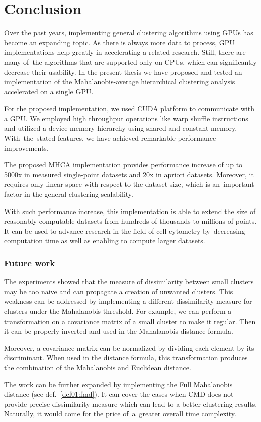 \chapter*{Conclusion}

Over the past years, implementing general clustering algorithms using GPUs has become an expanding topic. As there is always more data to process, GPU implementations help greatly in accelerating a related research.  Still, there are many of~the algorithms that are supported only on CPUs, which can significantly decrease their usability. In the present thesis we have proposed and tested an implementation of the Mahalanobis-average hierarchical clustering analysis accelerated on a single GPU. 

For the proposed implementation, we used CUDA platform to communicate with a GPU. We employed high throughput operations like warp shuffle instructions and utilized a device memory hierarchy using shared and constant memory. With~the~stated features, we have achieved remarkable performance improvements.

The proposed MHCA implementation provides performance increase of up to 5000x in measured single-point datasets and 20x in apriori datasets. Moreover, it requires only linear space with respect to the dataset size, which is an~important factor in the general clustering scalability.

With such performance increase, this implementation is able to extend the size of reasonably computable datasets from hundreds of thousands to millions of points. It can be used to advance research in the field of cell cytometry by~decreasing computation time as well as enabling to compute larger datasets.

\subsection*{Future work}

The experiments showed that the measure of dissimilarity between small clusters may be too naive and can propagate a creation of unwanted clusters. This weakness can be addressed by implementing a different dissimilarity measure for clusters under the Mahalanobis threshold. For example, we can perform a transformation on a covariance matrix of a small cluster to make it regular. Then it can be properly inverted and used in the Mahalanobis distance formula.

Moreover, a covariance matrix can be normalized by dividing each element by its discriminant. When used in the distance formula, this transformation produces the combination of the Mahalanobis and Euclidean distance.

The work can be further expanded by implementing the Full Mahalanobis distance (see def.~\ref{def01:fmd}). It can cover the cases when CMD does not provide precise dissimilarity measure which can lead to a better clustering results. Naturally, it would come for the price of~a~greater overall time complexity. 
